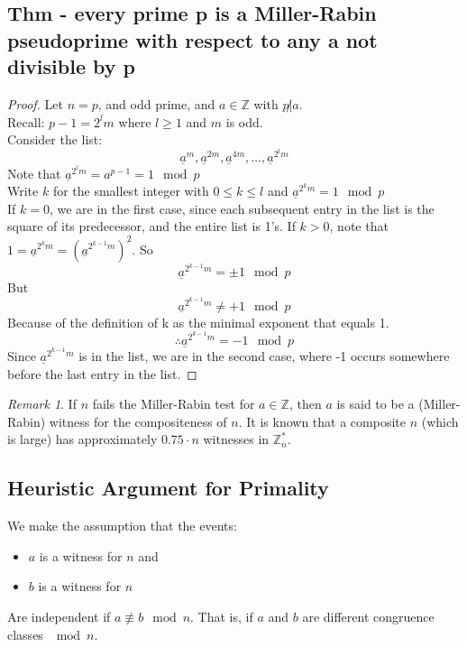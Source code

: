 \documentclass[10pt]{article}
\newcommand{\Z}{\mathbb{Z}}
\theoremstyle{definition}
\theoremstyle{remark}
\newtheorem{remark}[theorem]{Remark}
\def\Z{\mathbb{ Z}}
\def\ul{\underline}
\begin{document}
\subsection{Thm - every prime p is a Miller-Rabin pseudoprime with respect to any a not divisible by p}
\begin{proof}
Let $n = p$, and odd prime, and $a \in \Z$ with $p \not | a$.\\
Recall: $p-1 = 2^lm$ where $l \geq1$ and $m$ is odd.\\
Consider the list:
$$\ul{a}^m,\ul{a}^{2m},\ul{a}^{4m},\ldots,\ul{a}^{2^lm}$$
Note that $\ul{a}^{2^lm} = a^{p-1} = 1 \mod p$\\
Write $k$ for the smallest integer with $0 \leq k \leq l$ and $\ul{a}^{2^km} = 1 \mod p$\\
If $k=0$, we are in the first case, since each subsequent entry in the list is the square of its predecessor, and the entire list is 1's.  If $k>0$, note that $1=\ul{a}^{2^km}=(\ul{a}^{2^{k-1}m})^2$.  So
$$\ul{a}^{2^{k-1}m} = \pm 1 \mod p$$
But
$$\ul{a}^{2^{k-1}m} \neq +1 \mod p$$
Because of the definition of k as the minimal exponent that equals 1.
$$\therefore \ul{a}^{2^{k-1}m} = -1 \mod p$$
Since $\ul{a}^{2^{k-1}m}$ is in the list, we are in the second case, where -1 occurs somewhere before the last entry in the list.
\end{proof}
\begin{remark}
If $n$ fails the Miller-Rabin test for $a\in\Z$, then $a$ is said to be a (Miller-Rabin) witness for the compositeness of $n$.  It is known that a composite $n$ (which is large) has approximately $0.75 \cdot n$ witnesses in $\Z_n^*$.
\end{remark}
\subsection{Heuristic Argument for Primality}
We make the assumption that the events:
\begin{itemize}
\item $a$ is a witness for $n$ and
\item $b$ is a witness for $n$
\end{itemize}
Are independent if $a \not \equiv b \mod n$.  That is, if $a$ and $b$ are different congruence classes $\mod n$.
\end{document}
